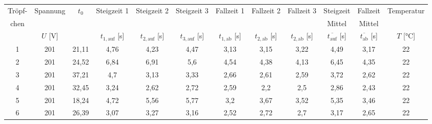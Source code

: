\begin{landscape}
\begin{table}[!ht]
    \centering
    \begin{tabular}{c c c c c c c c c c c c}
        \toprule
		Tröpf- & Spannung & $t_0$ & Steigzeit 1 & Steigzeit 2 & Steigzeit 3 & Fallzeit 1 & Fallzeit 2 & Fallzeit 3 & Steigzeit & Fallzeit & Temperatur\\
        chen & & & & & & & & & Mittel & Mittel& \\
         & $U$ [\si{\volt}]&  & $t_{1,\text{auf}}$ [\si{\second}] & $t_{2,\text{auf}}$ [\si{\second}]& $t_{3,\text{auf}}$ [\si{\second}] & $t_{1,\text{ab}}$ [\si{\second}] & $t_{2,\text{ab}}$ [\si{\second}] & $t_{2,\text{ab}}$ [\si{\second}] & $\overline{t_{\text{auf}}}$ [\si{\second}] & $\overline{t_{\text{ab}}}$ [\si{\second}] & $T$ [\si{\celsius}]\\
        \midrule
            1&        201 & 21,11 &                      4,76 &                      4,23 &                      4,47 &                3,13 &                3,15 &                3,22 &                                               4,49 &       3,17 &                 22 \\
            2&        201 & 24,52 &                      6,84 &                      6,91 &                       5,6 &                4,54 &                4,38 &                4,13 &                                               6,45 &       4,35 &                 22 \\
            3&        201 & 37,21 &                       4,7 &                      3,13 &                      3,33 &                2,66 &                2,61 &                2,59 &                                               3,72 &       2,62 &                 22 \\
            4&        201 & 32,45 &                      3,24 &                      2,62 &                      2,72 &                2,59 &                 2,2 &                 2,5 &                                               2,86 &       2,43 &                 22 \\
            5&        201 & 18,24 &                      4,72 &                      5,56 &                      5,77 &                 3,2 &                3,67 &                3,52 &                                               5,35 &       3,46 &                 22 \\
            6&        201 & 26,39 &                      3,07 &                      3,27 &                      3,16 &                2,52 &                2,72 &                 2,7 &                                               3,17 &       2,65 &                 22 \\

\end{tabular}
\end{table}
\end{landscape}
